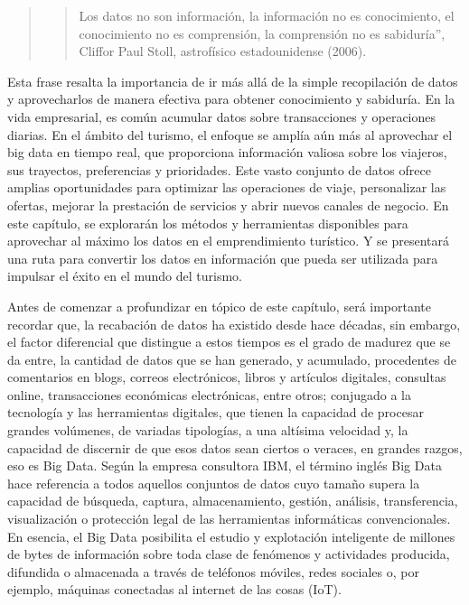 \documentclass[
  letterpaper,
  DIV=11,
  numbers=noendperiod]{scrreprt}
\begin{document}
\begin{quote}
\begin{quote}
Los datos no son información, la información no es conocimiento, el
conocimiento no es comprensión, la comprensión no es sabiduría'',
Cliffor Paul Stoll, astrofísico estadounidense (2006).
\end{quote}
\end{quote}

Esta frase resalta la importancia de ir más allá de la simple
recopilación de datos y aprovecharlos de manera efectiva para obtener
conocimiento y sabiduría. En la vida empresarial, es común acumular
datos sobre transacciones y operaciones diarias. En el ámbito del
turismo, el enfoque se amplía aún más al aprovechar el big data en
tiempo real, que proporciona información valiosa sobre los viajeros, sus
trayectos, preferencias y prioridades. Este vasto conjunto de datos
ofrece amplias oportunidades para optimizar las operaciones de viaje,
personalizar las ofertas, mejorar la prestación de servicios y abrir
nuevos canales de negocio. En este capítulo, se explorarán los métodos y
herramientas disponibles para aprovechar al máximo los datos en el
emprendimiento turístico. Y se presentará una ruta para convertir los
datos en información que pueda ser utilizada para impulsar el éxito en
el mundo del turismo.

Antes de comenzar a profundizar en tópico de este capítulo, será
importante recordar que, la recabación de datos ha existido desde hace
décadas, sin embargo, el factor diferencial que distingue a estos
tiempos es el grado de madurez que se da entre, la cantidad de datos que
se han generado, y acumulado, procedentes de comentarios en blogs,
correos electrónicos, libros y artículos digitales, consultas online,
transacciones económicas electrónicas, entre otros; conjugado a la
tecnología y las herramientas digitales, que tienen la capacidad de
procesar grandes volúmenes, de variadas tipologías, a una altísima
velocidad y, la capacidad de discernir de que esos datos sean ciertos o
veraces, en grandes razgos, eso es Big Data. Según la empresa consultora
IBM, el término inglés Big Data hace referencia a todos aquellos
conjuntos de datos cuyo tamaño supera la capacidad de búsqueda, captura,
almacenamiento, gestión, análisis, transferencia, visualización o
protección legal de las herramientas informáticas convencionales. En
esencia, el Big Data posibilita el estudio y explotación inteligente de
millones de bytes de información sobre toda clase de fenómenos y
actividades producida, difundida o almacenada a través de teléfonos
móviles, redes sociales o, por ejemplo, máquinas conectadas al internet
de las cosas (IoT).
\end{document}
